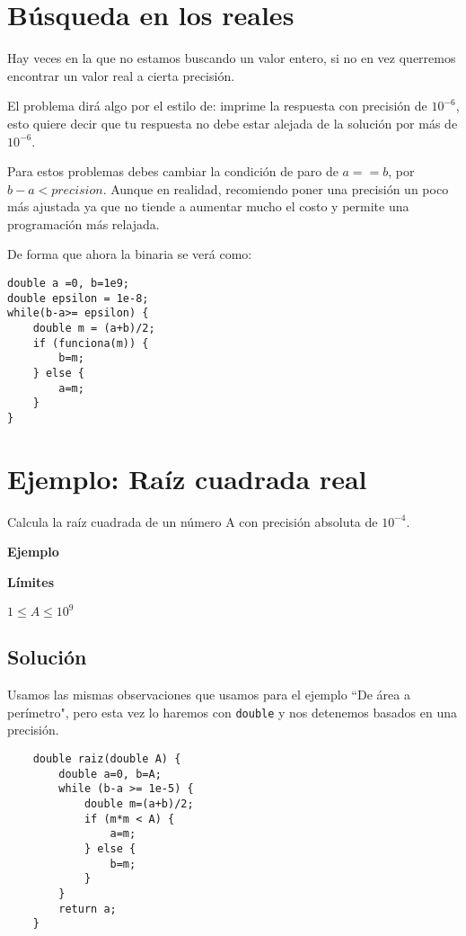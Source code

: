 \section{Búsqueda en los reales}
Hay veces en la que no estamos buscando un valor entero, si no en vez querremos encontrar un valor real a cierta precisión.

El problema dirá algo por el estilo de: imprime la respuesta con precisión de \(10^{-6}\), esto quiere decir que tu respuesta no debe estar alejada de la solución por más de \(10^{-6}\).

Para estos problemas debes cambiar la condición de paro de \(a==b\), por \(b-a < precision\). Aunque en realidad, recomiendo poner una precisión un poco más ajustada ya que no tiende a aumentar mucho el costo y permite una programación más relajada.

De forma que ahora la binaria se verá como:

\begin{lstlisting}
double a =0, b=1e9;
double epsilon = 1e-8;
while(b-a>= epsilon) {
	double m = (a+b)/2;
	if (funciona(m)) {
		b=m;
	} else {
		a=m;
	}
}
\end{lstlisting}

\section{Ejemplo: Raíz cuadrada real}
Calcula la raíz cuadrada de un número A con precisión absoluta de \(10^{-4}\).

\textbf{Ejemplo}\\
\begin{casebox2}
\end{casebox2}

\textbf{Límites}
\begin{plimits}
	\item \(1\leq A \leq 10^9\)
\end{plimits}

\subsection*{Solución}
Usamos las mismas observaciones que usamos para el ejemplo ``De área a perímetro", pero esta vez lo haremos con \lstinline|double| y nos detenemos basados en una precisión.
\begin{lstlisting}
	double raiz(double A) {
		double a=0, b=A;
		while (b-a >= 1e-5) {
			double m=(a+b)/2;
			if (m*m < A) {
				a=m;
			} else {
				b=m;
			}
		}
		return a;
	}
\end{lstlisting}

